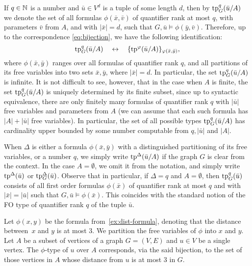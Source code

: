 If $q\in \mathbb{N}$ is a number and $\bar u\in  V^{d}$
is a tuple of some length $d$, then by $\mathrm{tp}^q_G(\bar u/A)$  we denote the set of all formulas $\phi(\bar x,\bar v)$
of quantifier rank at most $q$, with parameters $\bar v$ from $A$, and with $|\bar x|=d$,
such that $G,\bar u\models \phi(\bar y,\bar v)$.
Therefore, up to the correspondence \eqref{eq:bijection}, we have the following identification:
$$\mathrm{tp}^q_G(\bar u/A)\quad\leftrightarrow\quad\{\mathrm{tp}^\varphi(\bar u/A)\}_{\varphi(\bar x,\bar y)},$$
where $\phi(\bar x,\bar y)$ ranges over all formulas of quantifier rank $q$, and all partitions of its free variables into two sets $\bar x,\bar y$,
where $|\bar x|=d$. 
In particular, the set $\mathrm{tp}^q_G(\bar u/A)$ is infinite.
It is not difficult to see, however, that in the case when $A$ is finite,
the set $\mathrm{tp}^q_G(\bar u/A)$ is uniquely determined by its finite subset, since up to syntactic equivalence, 
there are only finitely many formulas of quantifier rank $q$ with $|\bar u|$ free variables and parameters from $A$
(we can assume that each such formula has $|A|+|\bar u|$ free variables).
In particular, the set of all possible types 
$\mathrm{tp}^q_G(\bar u/A)$ has cardinality upper bounded by some number 
 computable from $q,|\bar u|$ and $|A|$.

When $\Delta$ is either a formula $\phi(\bar x,\bar y)$ with a distinguished partitioning of its free variables, or a number $q$,
we simply write $\mathrm{tp}^\Delta(\bar u/A)$ if the graph $G$
is clear from the context.
In the case $A=\emptyset$, we omit it from the notation, 
and simply write $\mathrm{tp}^\Delta(\bar u)$ or $\mathrm{tp}^\Delta_G(\bar u)$.
Observe that in particular, if $\Delta=q$ and $A=\emptyset$, then $\mathrm{tp}^q_G(\bar u)$ consists of all first order formulas $\phi(\bar x)$ of quantifier rank at most $q$ and with $|\bar x|=|\bar u|$
such that $G,\bar u\models \phi(\bar x)$. This coincides with the standard notion of the FO type of quantifier rank $q$ of the tuple $\bar u$.

\begin{example}
Let $\phi(x,y)$	be the formula from~\cref{ex:dist-formula}, denoting that the distance between~$x$ and $y$ is at most $3$.
We  partition  the free variables of $\phi$
into $x$ and $y$.
Let $A$ be a subset of vertices of a graph $G=(V,E)$
and $u\in V$ be a single vertex.
The $\phi$-type of $u$ over $A$
corresponds, via the said bijection, to the set of those vertices in $A$
whose distance from $u$ is at most $3$ in $G$.
\end{example}

